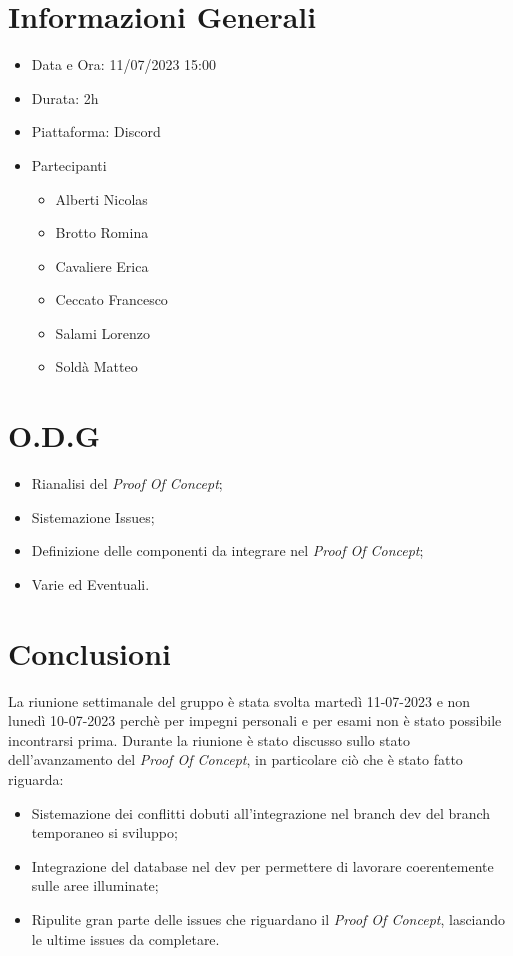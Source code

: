 \documentclass[a4paper, 12pt]{article}
\begin{document}
\makefrontpage

\section*{Informazioni Generali}
\begin{itemize}
    \item Data e Ora: 11/07/2023 15:00
    \item Durata: 2h
    \item Piattaforma: Discord
    \item Partecipanti
    \begin{itemize}
        \item Alberti Nicolas
        \item Brotto Romina
        \item Cavaliere Erica
        \item Ceccato Francesco
        \item Salami Lorenzo
        \item Soldà Matteo
    \end{itemize}
\end{itemize}

\section*{O.D.G}
\begin{itemize}
    \item Rianalisi del \textit{Proof Of Concept};
    \item Sistemazione Issues;
    \item Definizione delle componenti da integrare nel \textit{Proof Of Concept};
    \item Varie ed Eventuali.
\end{itemize}

\section*{Conclusioni}
La riunione settimanale del gruppo è stata svolta martedì 11-07-2023 e non lunedì 10-07-2023 perchè per impegni personali e per esami non è stato possibile incontrarsi prima.
Durante la riunione è stato discusso sullo stato dell'avanzamento del \textit{Proof Of Concept}, in particolare ciò che è stato fatto riguarda:
\begin{itemize}
    \item Sistemazione dei conflitti dobuti all'integrazione nel branch dev del branch temporaneo si sviluppo;
    \item Integrazione del database nel dev per permettere di lavorare coerentemente sulle aree illuminate;
    \item Ripulite gran parte delle issues che riguardano il \textit{Proof Of Concept}, lasciando le ultime issues da completare.
\end{itemize}
\end{document}
